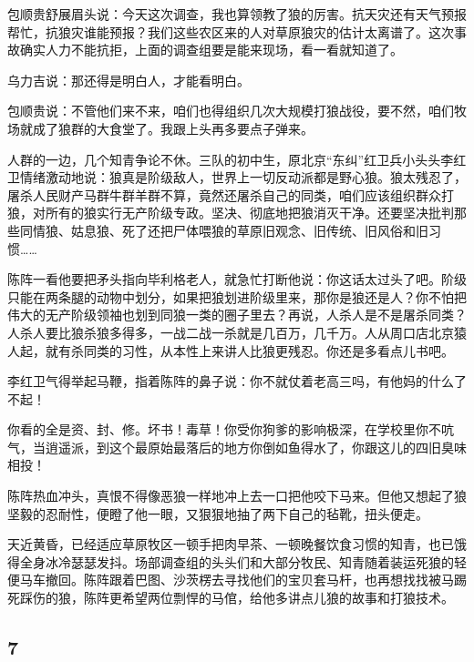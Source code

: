 \par 包顺贵舒展眉头说：今天这次调查，我也算领教了狼的厉害。抗天灾还有天气预报帮忙，抗狼灾谁能预报？我们这些农区来的人对草原狼灾的估计太离谱了。这次事故确实人力不能抗拒，上面的调查组要是能来现场，看一看就知道了。
\par 乌力吉说：那还得是明白人，才能看明白。
\par 包顺贵说：不管他们来不来，咱们也得组织几次大规模打狼战役，要不然，咱们牧场就成了狼群的大食堂了。我跟上头再多要点子弹来。
\par 人群的一边，几个知青争论不休。三队的初中生，原北京“东纠”红卫兵小头头李红卫情绪激动地说：狼真是阶级敌人，世界上一切反动派都是野心狼。狼太残忍了，屠杀人民财产马群牛群羊群不算，竟然还屠杀自己的同类，咱们应该组织群众打狼，对所有的狼实行无产阶级专政。坚决、彻底地把狼消灭干净。还要坚决批判那些同情狼、姑息狼、死了还把尸体喂狼的草原旧观念、旧传统、旧风俗和旧习惯……
\par 陈阵一看他要把矛头指向毕利格老人，就急忙打断他说：你这话太过头了吧。阶级只能在两条腿的动物中划分，如果把狼划进阶级里来，那你是狼还是人？你不怕把伟大的无产阶级领袖也划到同狼一类的圈子里去？再说，人杀人是不是屠杀同类？人杀人要比狼杀狼多得多，一战二战一杀就是几百万，几千万。人从周口店北京猿人起，就有杀同类的习性，从本性上来讲人比狼更残忍。你还是多看点儿书吧。
\par 李红卫气得举起马鞭，指着陈阵的鼻子说：你不就仗着老高三吗，有他妈的什么了不起！
\par 你看的全是资、封、修。坏书！毒草！你受你狗爹的影响极深，在学校里你不吭气，当逍遥派，到这个最原始最落后的地方你倒如鱼得水了，你跟这儿的四旧臭味相投！
\par 陈阵热血冲头，真恨不得像恶狼一样地冲上去一口把他咬下马来。但他又想起了狼坚毅的忍耐性，便瞪了他一眼，又狠狠地抽了两下自己的毡靴，扭头便走。
\par 天近黄昏，已经适应草原牧区一顿手把肉早茶、一顿晚餐饮食习惯的知青，也已饿得全身冰冷瑟瑟发抖。场部调查组的头头们和大部分牧民、知青随着装运死狼的轻便马车撤回。陈阵跟着巴图、沙茨楞去寻找他们的宝贝套马杆，也再想找找被马踢死踩伤的狼，陈阵更希望两位剽悍的马倌，给他多讲点儿狼的故事和打狼技术。


\subsection*{7}

